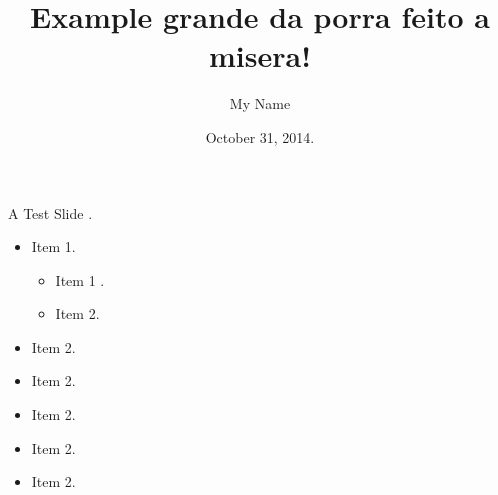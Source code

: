 \documentclass[table,11pt]{beamer}
\title{Example grande da porra feito a misera!}
\author{My Name}
\institute{\small Reuse in Software Engineering Lab\\[.25\baselineskip]
\footnotesize Federal Univerity of Bahia}
\date{October 31, 2014.}
\begin{document}
 
 
\begin{frame}[plain]    
  \titlepage   
\end{frame}        
     
\begin{frame}{A Test Slide .} 
  \begin{itemize}     
    \item Item 1.        
    \begin{itemize}     
    \item Item 1 .     
    \item Item 2.    
  \end{itemize}      
    \item Item 2. 
     \item Item 2. 
      \item Item 2.  
       \item Item 2. 
        \item Item 2.   
  \end{itemize} 
\end{frame}
 
\end{document}
